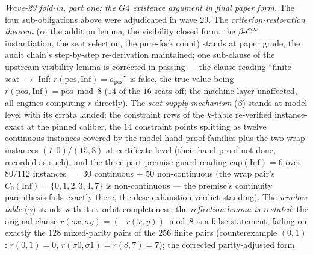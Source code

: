 \emph{Wave-29 fold-in, part one: the $G4$ existence argument in final paper
form.} The four sub-obligations above were adjudicated in wave 29. The
\emph{criterion-restoration theorem} ($\alpha$: the addition lemma, the
visibility closed form, the $\beta$-$C^\infty$ instantiation, the seat
selection, the pure-fork count) stands at paper grade, the audit chain's
step-by-step re-derivation maintained; one sub-clause of the upstream
visibility lemma is corrected in passing --- the clause reading ``finite
seat $\to$ Inf: $r(\mathrm{pos},\mathrm{Inf})=a_{\mathrm{pos}}$'' is false,
the true value being $r(\mathrm{pos},\mathrm{Inf})=\mathrm{pos}\bmod 8$
($14$ of the $16$ seats off; the machine layer unaffected, all engines
computing $r$ directly). The \emph{seat-supply mechanism} ($\beta$) stands
at model level with its errata landed: the constraint rows of the $k$-table
re-verified instance-exact at the pinned caliber, the $14$ constraint
points splitting as twelve continuous instances covered by the model
hand-proof families plus the two wrap instances $(7,0)/(15,8)$ at
certificate level (their hand proof not done, recorded as such), and the
three-part premise guard reading $\mathrm{cap}(\mathrm{Inf})=6$ over
$80/112$ instances $=$ $30$ continuous $+$ $50$ non-continuous (the wrap
pair's $C_0(\mathrm{Inf})=\{0,1,2,3,4,7\}$ is non-continuous --- the
premise's continuity parenthesis fails exactly there, the desc-exhaustion
verdict standing). The \emph{window table} ($\gamma$) stands with its
$\tau$-orbit completeness; the \emph{reflection lemma is restated}: the
original clause $r(\sigma x,\sigma y)=(-r(x,y))\bmod 8$ is a false
statement, failing on exactly the $128$ mixed-parity pairs of the $256$
finite pairs (counterexample $(0,1)$: $r(0,1)=0$,
$r(\sigma0,\sigma1)=r(8,7)=7$); the corrected parity-adjusted form
